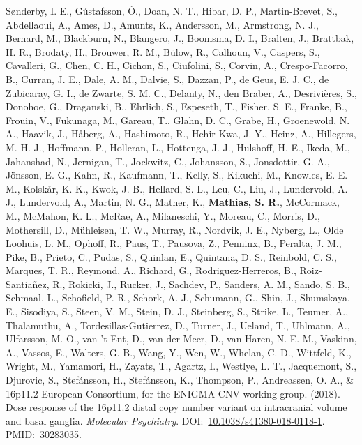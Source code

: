 \documentclass[10pt]{article}
\makeatletter
\newlength{\bibhang}
\newlength{\bibsep}
 {\@listi \global\bibsep\itemsep \global\advance\bibsep by\parsep}
\newenvironment{bibsection}%
        {\vspace{-\baselineskip}\begin{list}{}{%
       \setlength{\leftmargin}{\bibhang}%
       \setlength{\itemindent}{-\leftmargin}%
       \setlength{\itemsep}{\bibsep}%
       \setlength{\parsep}{\z@}%
        \setlength{\partopsep}{0pt}%
        \setlength{\topsep}{0pt}}}
        {\end{list}\vspace{-.6\baselineskip}}
\makeatother
\begin{document}
\begin{bibsection}
\item Sønderby, I. E., Gústafsson, Ó., Doan, N. T., Hibar, D. P., Martin-Brevet, S., Abdellaoui, A., Ames, D., Amunts, K., Andersson, M., Armstrong, N. J., Bernard, M., Blackburn, N., Blangero, J., Boomsma, D. I., Bralten, J., Brattbak, H. R., Brodaty, H., Brouwer, R. M., Bülow, R., Calhoun, V., Caspers, S., Cavalleri, G., Chen, C. H., Cichon, S., Ciufolini, S., Corvin, A., Crespo-Facorro, B., Curran, J. E., Dale, A. M., Dalvie, S., Dazzan, P., de Geus, E. J. C., de Zubicaray, G. I., de Zwarte, S. M. C., Delanty, N., den Braber, A., Desrivières, S., Donohoe, G., Draganski, B., Ehrlich, S., Espeseth, T., Fisher, S. E., Franke, B., Frouin, V., Fukunaga, M., Gareau, T., Glahn, D. C., Grabe, H., Groenewold, N. A., Haavik, J., Håberg, A., Hashimoto, R., Hehir-Kwa, J. Y., Heinz, A., Hillegers, M. H. J., Hoffmann, P., Holleran, L., Hottenga, J. J., Hulshoff, H. E., Ikeda, M., Jahanshad, N., Jernigan, T., Jockwitz, C., Johansson, S., Jonsdottir, G. A., Jönsson, E. G., Kahn, R., Kaufmann, T., Kelly, S., Kikuchi, M., Knowles, E. E. M., Kolskår, K. K., Kwok, J. B., Hellard, S. L., Leu, C., Liu, J., Lundervold, A. J., Lundervold, A., Martin, N. G., Mather, K., \textbf{Mathias, S. R.}, McCormack, M., McMahon, K. L., McRae, A., Milaneschi, Y., Moreau, C., Morris, D., Mothersill, D., Mühleisen, T. W., Murray, R., Nordvik, J. E., Nyberg, L., Olde Loohuis, L. M., Ophoff, R., Paus, T., Pausova, Z., Penninx, B., Peralta, J. M., Pike, B., Prieto, C., Pudas, S., Quinlan, E., Quintana, D. S., Reinbold, C. S., Marques, T. R., Reymond, A., Richard, G., Rodriguez-Herreros, B., Roiz-Santiañez, R., Rokicki, J., Rucker, J., Sachdev, P., Sanders, A. M., Sando, S. B., Schmaal, L., Schofield, P. R., Schork, A. J., Schumann, G., Shin, J., Shumskaya, E., Sisodiya, S., Steen, V. M., Stein, D. J., Steinberg, S., Strike, L., Teumer, A., Thalamuthu, A., Tordesillas-Gutierrez, D., Turner, J., Ueland, T., Uhlmann, A., Ulfarsson, M. O., van 't Ent, D., van der Meer, D., van Haren, N. E. M., Vaskinn, A., Vassos, E., Walters, G. B., Wang, Y., Wen, W., Whelan, C. D., Wittfeld, K., Wright, M., Yamamori, H., Zayats, T., Agartz, I., Westlye, L. T., Jacquemont, S., Djurovic, S., Stefánsson, H., Stefánsson, K., Thompson, P., Andreassen, O. A., \& 16p11.2 European Consortium, for the ENIGMA-CNV working group. (2018). Dose response of the 16p11.2 distal copy number variant on intracranial volume and basal ganglia. \emph{Molecular Psychiatry}. DOI:~\href{https://doi.org/10.1038/s41380-018-0118-1}{10.1038/s41380-018-0118-1}. PMID:~\href{https://www.ncbi.nlm.nih.gov/pubmed/?term=30283035}{30283035}.

\end{bibsection}
\end{document}
